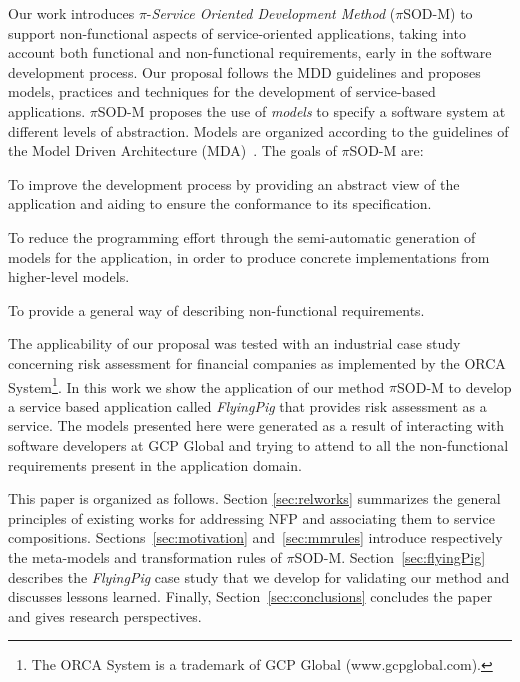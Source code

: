 \documentclass{singlecol-new}
\theoremstyle{TH}{
\newtheorem{lemma}{Lemma}
\newtheorem{theorem}[lemma]{Theorem}
\newtheorem{corrolary}[lemma]{Corrolary}
\newtheorem{conjecture}[lemma]{Conjecture}
\newtheorem{proposition}[lemma]{Proposition}
\newtheorem{claim}[lemma]{Claim}
\newtheorem{stheorem}[lemma]{Wrong Theorem}
\newtheorem{algorithm}{Algorithm}
}
\theoremstyle{THrm}{
\newtheorem{definition}{Definition}[section]
\newtheorem{question}{Question}[section]
\newtheorem{remark}{Remark}
\newtheorem{scheme}{Scheme}
}
\theoremstyle{THhit}{
\newtheorem{case}{Case}[section]
}
\theoremstyle{THhsl}{
\newtheorem{example}{Example}
}
\newcommand{\pisodm}[0]{$\pi$SOD-M\xspace}
\def\FlyingPig{\textsl{FlyingPig}\xspace}
\begin{document}
Our work introduces $\pi$-\textit{Service Oriented Development Method} (\pisodm) to support non-functional aspects of service-oriented applications, taking into account both functional and non-functional requirements, early in the software development process.
Our proposal follows the MDD guidelines and proposes models, practices and techniques for the development of service-based applications.  
\pisodm proposes  the use of \textit{models} to specify a software system at different levels of abstraction.
Models are organized according to the guidelines of the Model Driven Archi\-tec\-ture (MDA)~\cite{miller}.
The goals of  \pisodm are:

\begin{compactenum}[i]
\item To improve the development process by providing an abstract view of the application and aiding to ensure the conformance to its specification.
\item To reduce the programming effort through the semi-automatic generation of  models for the application, in order to produce concrete implementations from higher-level models.
\item To provide a general way of describing non-functional requirements.
\end{compactenum}

The applicability of our proposal was tested with an industrial case study concerning risk assessment for financial companies as implemented by the ORCA System\footnote{The ORCA System is a trademark of GCP Global (www.gcpglobal.com).}. In this work we show the application of our method \pisodm to develop a service based application called \FlyingPig that provides risk assessment as a service.
The models presented here were generated as a result of interacting with software developers at GCP Global and trying to attend to all the non-functional requirements present in the application domain.

This paper is organized as follows.
Sec\-tion \ref{sec:relworks} summarizes the general principles of existing works for addressing NFP and associating them to service compositions.
Sections~\ref{sec:motivation} and~\ref{sec:mmrules} introduce respectively the meta-models and transformation rules of \pisodm.
Section~\ref{sec:flyingPig} describes the \FlyingPig case study that we develop for validating our method and discusses lessons learned.
Finally, Section~\ref{sec:conclusions} concludes the paper and gives research perspectives.
\end{document}
